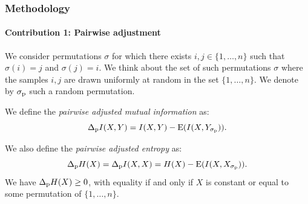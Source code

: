 \documentclass{tum-presentation}
\def\E{{\rm E}}
\def\sp{{\sigma_{\rm p}}}
\def\ip{\Delta_{\rm p}I}
\def\hp{\Delta_{\rm p} H}
\begin{document}
\begin{frame} 
	\frametitle{Methodology}
	\framesubtitle{Contribution 1: Pairwise adjustment \cite{Lazarenko2021pairwise}}
	We consider permutations $\sigma$ for which there exists $i,j \in \{1,\ldots,n\}$ 
	such that $\sigma(i) = j$ and $\sigma(j) = i$. We think about the set of such permutations $\sigma$ where the samples $i,j$ are drawn uniformly at random in the set $\{1,\ldots,n\}$. We denote by $\sp$ such a random permutation.
	
	\vspace{0.5cm}
			
	We  define the {\it pairwise adjusted mutual information} as:
	$$
	\ip(X,Y) = I(X,Y) - \E(I(X, Y_\sp)).
	$$
	
	\vspace{0.5cm}
	
	We  also define the {\it pairwise adjusted entropy} as:
	$$
	\hp(X) = \ip(X,X) =  H(X) - \E(I(X, X_\sp)).
	$$
	We have $\hp(X) \ge 0$, with equality if and only if  $X$ is constant or equal to some permutation of $\{1,\ldots,n\}$.
	
\end{frame}
\end{document}

